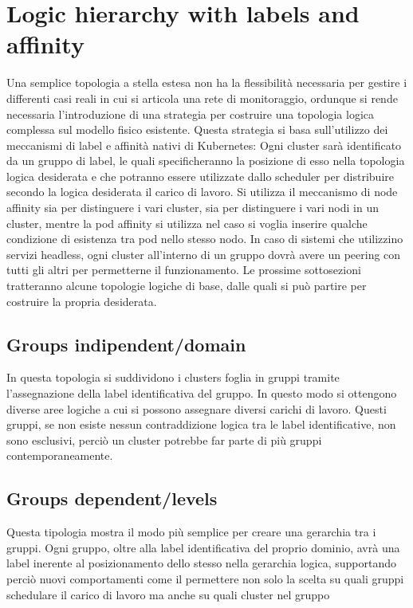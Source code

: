 \section{Logic hierarchy with labels and affinity}
Una semplice topologia a stella estesa non ha la flessibilità necessaria per gestire i differenti casi reali in cui si articola una rete di monitoraggio, ordunque si rende necessaria l'introduzione di una strategia per costruire una topologia logica complessa sul modello fisico esistente. Questa strategia si basa sull'utilizzo dei meccanismi di label e affinità nativi di Kubernetes: Ogni cluster sarà identificato da un gruppo di label, le quali specificheranno la posizione di esso nella topologia logica desiderata e che potranno essere utilizzate dallo scheduler per distribuire secondo la logica desiderata il carico di lavoro. Si utilizza il meccanismo di node affinity sia per distinguere i vari cluster, sia per distinguere i vari nodi in un cluster, mentre la pod affinity si utilizza nel caso si voglia inserire qualche condizione di esistenza tra pod nello stesso nodo. In caso di sistemi che utilizzino servizi headless, ogni cluster all'interno di un gruppo dovrà avere un peering con tutti gli altri per permetterne il funzionamento.
Le prossime sottosezioni tratteranno alcune topologie logiche di base, dalle quali si può partire per costruire la propria desiderata. 

\subsection{Groups indipendent/domain}
In questa topologia si suddividono i clusters foglia in gruppi tramite l'assegnazione della label identificativa del gruppo. In questo modo si ottengono diverse aree logiche a cui si possono assegnare diversi carichi di lavoro. Questi gruppi, se non esiste nessun contraddizione logica tra le label identificative, non sono esclusivi, perciò un cluster potrebbe far parte di più gruppi contemporaneamente.

\subsection{Groups dependent/levels}
Questa tipologia mostra il modo più semplice per creare una gerarchia tra i gruppi. Ogni gruppo, oltre alla label identificativa del proprio dominio, avrà una label inerente al posizionamento dello stesso nella gerarchia logica, supportando perciò nuovi comportamenti come il permettere non solo la scelta su quali gruppi schedulare il carico di lavoro ma anche su quali cluster nel gruppo

